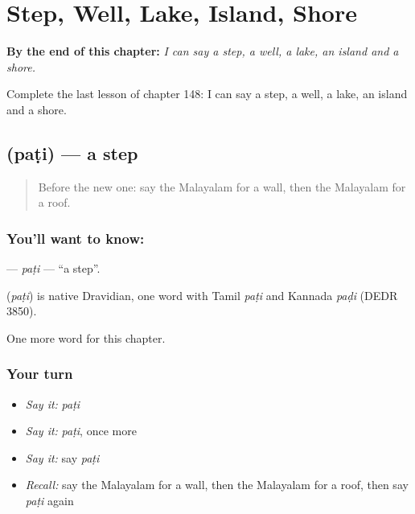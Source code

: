 
\chapter{Step, Well, Lake, Island, Shore}
\label{ch:ml-step-well-lake-island-shore}

\begin{chapteropening}
\textbf{By the end of this chapter:} \emph{I can say a step, a well, a lake, an island and a shore.}

Complete the last lesson of chapter 148: I can say a step, a well, a lake, an island and a shore.
\end{chapteropening}

\section[\texorpdfstring{\ml{പടി} (paṭi)}{പടി (paṭi)}]{ (paṭi) — a step}

\label{lesson:ML-C148-pati}



\begin{quote}
Before the new one: say the Malayalam for a wall, then the Malayalam for a roof.
\end{quote}

\subsection*{You'll want to know: }
\textbf{} — \emph{paṭi} — \textquotedblleft{}a step\textquotedblright{}.

\begin{cousinweb}
\textbf{} (\emph{paṭi}) is native Dravidian, one word with Tamil \emph{paṭi} and Kannada \emph{paḍi} (DEDR 3850).
\end{cousinweb}

\begin{grammarlens}[title={What you've built}]
One more word for this chapter.
\end{grammarlens}

\subsection*{Your turn}
\begin{itemize}
\raggedright
  \item \emph{Say it:} \emph{paṭi}
  \item \emph{Say it:} \emph{paṭi}, once more
  \item \emph{Say it:} say \emph{paṭi}
  \item \emph{Recall:} say the Malayalam for a wall, then the Malayalam for a roof, then say \emph{paṭi} again
\end{itemize}

